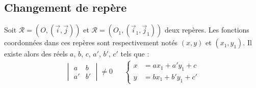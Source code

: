 \subsection{Changement de repère}
\begin{prop}
 Soit $\mathcal{R}=\left(O,(\overrightarrow i , \overrightarrow j) \right)$ et $\mathcal{R}=\left(O_1,(\overrightarrow i_1 , \overrightarrow j_1)\right) $ deux repères. Les fonctions coordonnées dans ces repères sont respectivement notés $(x,y)$ et $(x_1,y_1)$. Il existe alors des réels $a$, $b$, $c$, $a'$, $b'$, $c'$ tels que :
\begin{align*}
\begin{vmatrix}
 a & b \\
 a'& b'
\end{vmatrix}
\neq 0
& &
 \left\lbrace 
\begin{aligned}
 x &= a x_1 + a'y_1 + c \\
 y &= b x_1 + b' y_1 + c'  
\end{aligned}
\right. 
\end{align*}
\end{prop}
